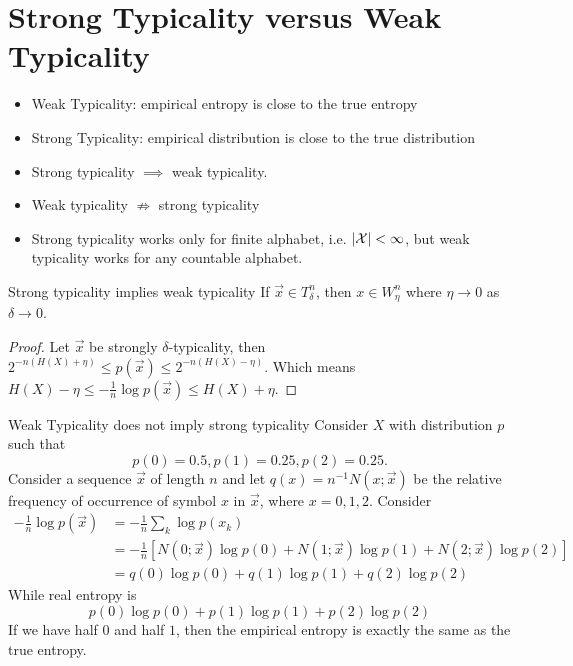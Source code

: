 \documentclass[../main.tex]{subfiles}
\begin{document}
\section*{Strong Typicality versus Weak Typicality}
\begin{remark*}
    \begin{itemize}
        \item Weak Typicality: empirical entropy is close to the true entropy
        \item Strong Typicality: empirical distribution is close to the true distribution
        \item Strong typicality $\implies$ weak typicality.
        \item Weak typicality $\not\Rightarrow$ strong typicality
        \item Strong typicality works only for finite alphabet, i.e. $|\mathcal{X}|<\infty$, but weak typicality works for any countable alphabet.
    \end{itemize}
\end{remark*}
\begin{bbox}{Strong typicality implies weak typicality}
If $\vec x\in T^{n}_\delta$, then $x\in W^{n}_{\eta}$ where $\eta \to 0$ as $\delta \to 0$.
\begin{proof}
    Let $\vec x$ be strongly $\delta$-typicality, then $2^{-n(H(X)+\eta)}\leq p(\vec x)\leq 2^{-n(H(X)-\eta)}$. Which means $H(X)-\eta \leq -\frac{1}{n}\log p(\vec x)\leq H(X)+\eta$.
\end{proof}
\end{bbox}
\begin{pbox}{Weak Typicality does not imply strong typicality}
    Consider $X$ with distribution $p$ such that \[
    p(0)=0.5, p(1)=0.25, p(2)=0.25.
    \] Consider a sequence $\vec x$ of length $n$ and let $q(x)=n^{-1}N(x;\vec x)$ be the relative frequency of occurrence of symbol $x$ in $\vec x$, where $x=0,1,2$.
    Consider \begin{align*}
        -\frac{1}{n}\log p(\vec x) &= -\frac{1}{n}\sum_k \log p(x_k)\\
        &= -\frac{1}{n}[N(0;\vec x)\log p(0) + N(1;\vec x)\log p(1)+N(2;\vec x)\log p(2)]\\
        &=q(0)\log p(0)+q(1)\log p(1)+q(2)\log p(2)        
    \end{align*}
    While real entropy is \[
    p(0)\log p(0)+p(1)\log p(1)+p(2)\log p(2)
    \]
    If we have half $0$ and half $1$, then the empirical entropy is exactly the same as the true entropy.
    \end{pbox}
\end{document}
